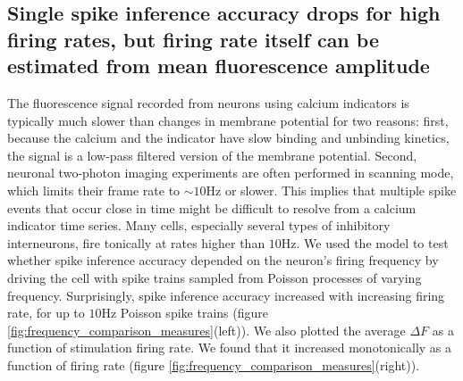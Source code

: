\documentclass[a4paper,12pt]{article}
\theoremstyle{definition}
\begin{document}
\subsection{Single spike inference accuracy drops for high firing rates, but firing rate itself can be estimated from mean fluorescence amplitude}
The fluorescence signal recorded from neurons using calcium indicators is typically much slower than changes in membrane potential for two reasons: first, because the calcium and the indicator have slow binding and unbinding kinetics, the signal is a low-pass filtered version of the membrane potential. Second, neuronal two-photon imaging experiments are often performed in scanning mode, which limits their frame rate to $\sim 10$Hz or slower. This implies that multiple spike events that occur close in time might be difficult to resolve from a calcium indicator time series. Many cells, especially several types of inhibitory interneurons, fire tonically at rates higher than $10$Hz. We used the model to test whether spike inference accuracy depended on the neuron’s firing frequency by driving the cell with spike trains sampled from Poisson processes of varying frequency. Surprisingly, spike inference accuracy increased with increasing firing rate, for up to $10$Hz Poisson spike trains (figure \ref{fig:frequency_comparison_measures}(left)). We also plotted the average $\Delta F$ as a function of stimulation firing rate. We found that it increased monotonically as a function of firing rate (figure \ref{fig:frequency_comparison_measures}(right)).
\end{document}
